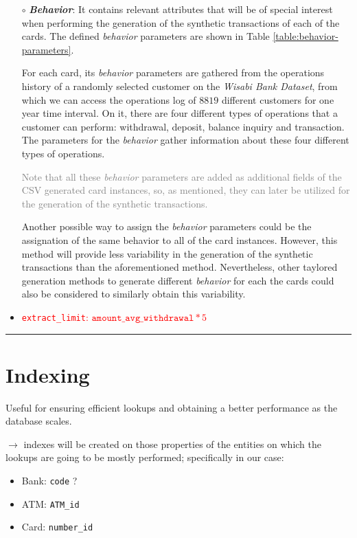 \documentclass{article}
\begin{document}
\begin{itemize}
\item[$\circ$]\textbf{\emph{Behavior}}: It contains relevant attributes that will be of special interest when performing the 
generation of the synthetic transactions of each of the cards. The defined \emph{behavior}
parameters are shown in Table \ref{table:behavior-parameters}. 



For each card, its \emph{behavior} parameters are gathered from the operations history of a randomly selected customer on the \emph{Wisabi Bank Dataset}, from which we can access the operations log of $8819$ different customers for one year time interval. On it, there are four different types of operations that a customer can perform: withdrawal, deposit, balance inquiry and transaction. The parameters
for the \emph{behavior} gather information about these four different types of operations.

\textcolor{gray}{Note that all these \emph{behavior} parameters are added as additional fields of the CSV generated card instances, so, as mentioned, they can later be utilized for the generation of the synthetic
transactions.}

Another possible way to assign the \emph{behavior} parameters could be the assignation
of the same behavior to all of the card instances. However, this method will provide less variability in
the generation of the synthetic transactions than the aforementioned method. 
Nevertheless, other taylored generation methods to generate different \emph{behavior} for 
each the cards could also be considered to similarly obtain this
variability.

\item \textcolor{red}{\texttt{extract\_limit}: $\texttt{amount\_avg\_withdrawal} * 5$}
\end{itemize}


\textcolor{green}{\rule{\linewidth}{0.4mm}}

\section{Indexing}

Useful for ensuring efficient lookups and obtaining a better performance as the database 
scales.

$\rightarrow$ indexes will be created on those properties of the entities on which the 
lookups are going to be mostly performed; specifically in our case:
\begin{itemize}
  \item Bank: \texttt{code} ?
  \item ATM: \texttt{ATM\_id}
  \item Card: \texttt{number\_id}
\end{itemize}
\end{document}

